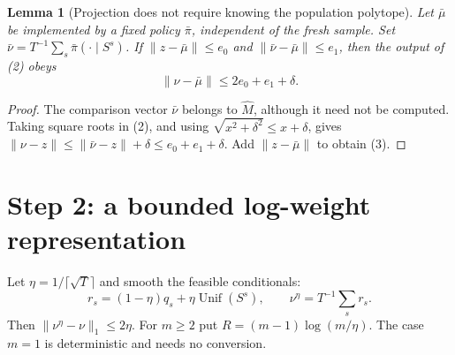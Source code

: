 \documentclass[11pt,a4paper]{article}
\newtheorem{lemma}[theorem]{Lemma}
\begin{document}
\begin{lemma}[Projection does not require knowing the population polytope]
Let $\bar\mu$ be implemented by a fixed policy $\bar\pi$, independent of the fresh sample. Set $\bar\nu=T^{-1}\sum_s\bar\pi(\cdot\mid S^s)$. If $\|z-\bar\mu\|\le e_0$ and $\|\bar\nu-\bar\mu\|\le e_1$, then the output of (2) obeys
\[
 \|\nu-\bar\mu\|\le2e_0+e_1+\delta. \tag{3}
\]
\end{lemma}
\begin{proof}
The comparison vector $\bar\nu$ belongs to $\widehat M$, although it need not be computed. Taking square roots in (2), and using $\sqrt{x^2+\delta^2}\le x+\delta$, gives $\|\nu-z\|\le\|\bar\nu-z\|+\delta\le e_0+e_1+\delta$. Add $\|z-\bar\mu\|$ to obtain (3).
\end{proof}

\section{Step 2: a bounded log-weight representation}
Let $\eta=1/\lceil\sqrt T\rceil$ and smooth the feasible conditionals:
\[
 r_s=(1-\eta)q_s+\eta\operatorname{Unif}(S^s),\qquad
 \nu^\eta=T^{-1}\sum_sr_s.
\]
Then $\|\nu^\eta-\nu\|_1\le2\eta$. For $m\ge2$ put
$R=(m-1)\log(m/\eta)$. The case $m=1$ is deterministic and needs no conversion.
\end{document}
